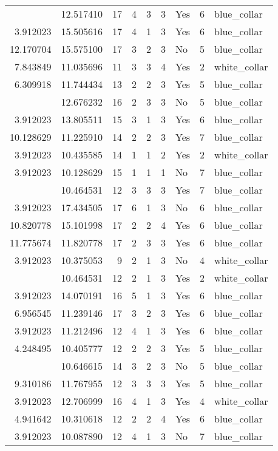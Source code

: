 \documentclass[
]{article}
\begin{document}
\begin{longtable}[t]{rrrrrllrl}
\addlinespace
10.375053 & 12.517410 & 17 & 4 & 3 & 3 & Yes & 6 & blue\_collar\\
3.912023 & 15.505616 & 17 & 4 & 1 & 3 & Yes & 6 & blue\_collar\\
12.170704 & 15.575100 & 17 & 3 & 2 & 3 & No & 5 & blue\_collar\\
7.843849 & 11.035696 & 11 & 3 & 3 & 4 & Yes & 2 & white\_collar\\
6.309918 & 11.744434 & 13 & 2 & 2 & 3 & Yes & 5 & blue\_collar\\
\addlinespace
11.918724 & 12.676232 & 16 & 2 & 3 & 3 & No & 5 & blue\_collar\\
3.912023 & 13.805511 & 15 & 3 & 1 & 3 & Yes & 6 & blue\_collar\\
10.128629 & 11.225910 & 14 & 2 & 2 & 3 & Yes & 7 & blue\_collar\\
3.912023 & 10.435585 & 14 & 1 & 1 & 2 & Yes & 2 & white\_collar\\
3.912023 & 10.128629 & 15 & 1 & 1 & 1 & No & 7 & blue\_collar\\
\addlinespace
11.462158 & 10.464531 & 12 & 3 & 3 & 3 & Yes & 7 & blue\_collar\\
3.912023 & 17.434505 & 17 & 6 & 1 & 3 & No & 6 & blue\_collar\\
10.820778 & 15.101998 & 17 & 2 & 2 & 4 & Yes & 6 & blue\_collar\\
11.775674 & 11.820778 & 17 & 2 & 3 & 3 & Yes & 6 & blue\_collar\\
3.912023 & 10.375053 & 9 & 2 & 1 & 3 & No & 4 & white\_collar\\
\addlinespace
3.912023 & 10.464531 & 12 & 2 & 1 & 3 & Yes & 2 & white\_collar\\
3.912023 & 14.070191 & 16 & 5 & 1 & 3 & Yes & 6 & blue\_collar\\
6.956545 & 11.239146 & 17 & 3 & 2 & 3 & Yes & 6 & blue\_collar\\
3.912023 & 11.212496 & 12 & 4 & 1 & 3 & Yes & 6 & blue\_collar\\
4.248495 & 10.405777 & 12 & 2 & 2 & 3 & Yes & 5 & blue\_collar\\
\addlinespace
9.215328 & 10.646615 & 14 & 3 & 2 & 3 & No & 5 & blue\_collar\\
9.310186 & 11.767955 & 12 & 3 & 3 & 3 & Yes & 5 & blue\_collar\\
3.912023 & 12.706999 & 16 & 4 & 1 & 3 & Yes & 4 & white\_collar\\
4.941642 & 10.310618 & 12 & 2 & 2 & 4 & Yes & 6 & blue\_collar\\
3.912023 & 10.087890 & 12 & 4 & 1 & 3 & No & 7 & blue\_collar\\

\end{longtable}
\end{document}
